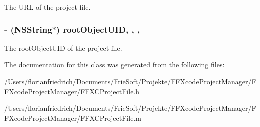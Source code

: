 The U\-R\-L of the project file. \hypertarget{interface_f_f_x_c_project_file_a39be39e55e3a695fcc9882ec72e53990}{
\subsubsection[{root\-Object\-U\-I\-D}]{\setlength{\rightskip}{0pt plus 5cm}-\/ (N\-S\-String$\ast$) root\-Object\-U\-I\-D\hspace{0.3cm}{\ttfamily [read]}, {\ttfamily [write]}, {\ttfamily [nonatomic]}, {\ttfamily [strong]}}}\label{interface_f_f_x_c_project_file_a39be39e55e3a695fcc9882ec72e53990}
The root\-Object\-U\-I\-D of the project file. 

The documentation for this class was generated from the following files\-:\begin{DoxyCompactItemize}
\item 
/\-Users/florianfriedrich/\-Documents/\-Frie\-Soft/\-Projekte/\-F\-F\-Xcode\-Project\-Manager/\-F\-F\-Xcode\-Project\-Manager/F\-F\-X\-C\-Project\-File.\-h\item 
/\-Users/florianfriedrich/\-Documents/\-Frie\-Soft/\-Projekte/\-F\-F\-Xcode\-Project\-Manager/\-F\-F\-Xcode\-Project\-Manager/F\-F\-X\-C\-Project\-File.\-m\end{DoxyCompactItemize}
